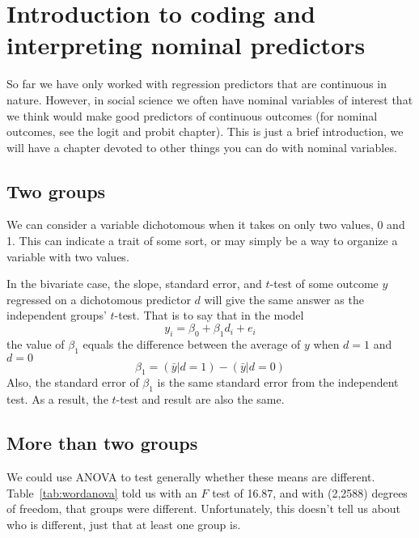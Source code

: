 \section{Introduction to coding and interpreting nominal predictors}
So far we have only worked with regression predictors that are continuous in nature. However, in social science we often have nominal variables of interest that we think would make good predictors of continuous outcomes (for nominal outcomes, see the logit and probit chapter). This is just a brief introduction, we will have a chapter devoted to other things you can do with nominal variables.
\subsection{Two groups}
We can consider a variable dichotomous when it takes on only two values, 0 and 1. This can indicate a trait of some sort, or may simply be a way to organize a variable with two values.

In the bivariate case, the slope, standard error, and $t$-test of some outcome $y$ regressed on a dichotomous predictor $d$ will give the same answer as the independent groups' $t$-test. That is to say that in the model
\begin{equation}
y_i=\beta_0+\beta_1d_i+e_i
\end{equation}
the value of $\beta_1$ equals the difference between the average of $y$ when $d=1$ and $d=0$
\begin{equation}
\beta_1 = \left(\bar{y}|d=1\right)-\left(\bar{y}|d=0\right)
\end{equation}
Also, the standard error of $\beta_1$ is the same standard error from the independent test. As a result, the $t$-test and result are also the same.
\subsection{More than two groups}

We could use ANOVA to test generally whether these means are different. Table~\ref{tab:wordanova} told us with an $F$ test of 16.87, and with (2,2588) degrees of freedom, that groups were different.  Unfortunately, this doesn't tell us about who is different, just that at least one group is.

